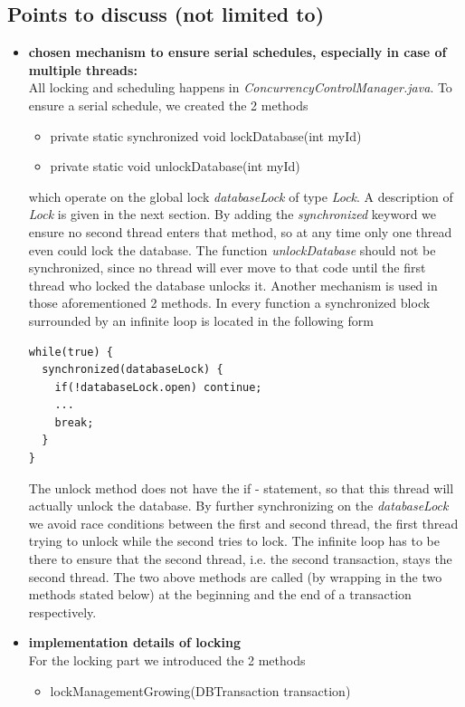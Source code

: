 \documentclass{vldb}
\begin{document}
\subsection{Points to discuss (not limited to)}
\begin{itemize}
\item \textbf{chosen mechanism to ensure serial schedules, especially in case of multiple threads:} \\All locking and scheduling happens in \textit{ConcurrencyControlManager.java}. To ensure a serial schedule, we created the 2 methods
\begin{itemize}
	\item private static synchronized void lockDatabase(int myId)
	\item private static void unlockDatabase(int myId)
\end{itemize}
which operate on the global lock \textit{databaseLock} of type \textit{Lock}. A description of \textit{Lock} is given in the next section. By adding the \textit{synchronized} keyword we ensure no second thread enters that method, so at any time only one thread even could lock the database. The function \textit{unlockDatabase} should not be synchronized, since no thread will ever move to that code until the first thread who locked the database unlocks it. Another mechanism is used in those aforementioned 2 methods. In every function a synchronized block surrounded by an infinite loop is located in the following form
\begin{verbatim}
while(true) {
  synchronized(databaseLock) {
    if(!databaseLock.open) continue;
    ...
    break;
  }
}
\end{verbatim}
The unlock method does not have the if - statement, so that this thread will actually unlock the database. By further synchronizing on the \textit{databaseLock} we avoid race conditions between the first and second thread, the first thread trying to unlock while the second tries to lock. The infinite loop has to be there to ensure that the second thread, i.e. the second transaction, stays the second thread. The two above methods are called (by wrapping in the two methods stated below) at the beginning and the end of a transaction respectively.
\item \textbf{implementation details of locking} \\For the locking part we introduced the 2 methods
\begin{itemize}
	\item lockManagementGrowing(DBTransaction transaction)

\end{itemize}
\end{itemize}
\end{document}
